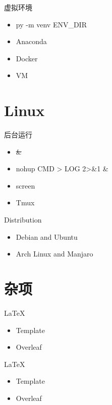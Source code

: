 \documentclass{beamer}
\begin{document}
\begin{frame}{虚拟环境}
    \begin{itemize}
        \item py -m venv ENV\_DIR
        \item Anaconda
        \item Docker
        \item VM
    \end{itemize}
\end{frame}

\section{Linux}

\begin{frame}{后台运行}
    \begin{itemize}
        \item \sout{\&}
        \item nohup CMD > LOG 2>\&1 \&
        \item screen
        \item Tmux
    \end{itemize}
\end{frame}

\begin{frame}{Distribution}
    \begin{itemize}
        \item Debian and Ubuntu
        \item Arch Linux and Manjaro
    \end{itemize}
\end{frame}

\section{杂项}

\begin{frame}{LaTeX}
    \begin{itemize}
        \item Template
        \item Overleaf
    \end{itemize}
\end{frame}

\begin{frame}{LaTeX}
    \begin{itemize}
        \item Template
        \item Overleaf
    \end{itemize}
\end{frame}
\end{document}
